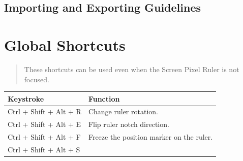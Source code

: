 \documentclass[
]{book}
\begin{document}
\hypertarget{importing-and-exporting-guidelines}{%
\section{Importing and Exporting Guidelines}\label{importing-and-exporting-guidelines}}

\hypertarget{keyboard}{%
\chapter{Global Shortcuts}\label{keyboard}}

\begin{quote}
These shortcuts can be used even when the Screen Pixel Ruler is not focused.
\end{quote}

\begin{longtable}[]{@{}ll@{}}
\toprule
\begin{minipage}[b]{0.27\columnwidth}\raggedright
Keystroke\strut
\end{minipage} & \begin{minipage}[b]{0.68\columnwidth}\raggedright
Function\strut
\end{minipage}\tabularnewline
\midrule
\endhead
\begin{minipage}[t]{0.27\columnwidth}\raggedright
Ctrl + Shift + Alt + R\strut
\end{minipage} & \begin{minipage}[t]{0.68\columnwidth}\raggedright
Change ruler rotation.\strut
\end{minipage}\tabularnewline
\begin{minipage}[t]{0.27\columnwidth}\raggedright
Ctrl + Shift + Alt + E\strut
\end{minipage} & \begin{minipage}[t]{0.68\columnwidth}\raggedright
Flip ruler notch direction.\strut
\end{minipage}\tabularnewline
\begin{minipage}[t]{0.27\columnwidth}\raggedright
Ctrl + Shift + Alt + F\strut
\end{minipage} & \begin{minipage}[t]{0.68\columnwidth}\raggedright
Freeze the position marker on the ruler.\strut
\end{minipage}\tabularnewline
\begin{minipage}[t]{0.27\columnwidth}\raggedright
Ctrl + Shift + Alt + S\strut
\end{minipage} & \begin{minipage}[t]{0.68\columnwidth}\raggedright

\end{minipage}
\end{longtable}
\end{document}

